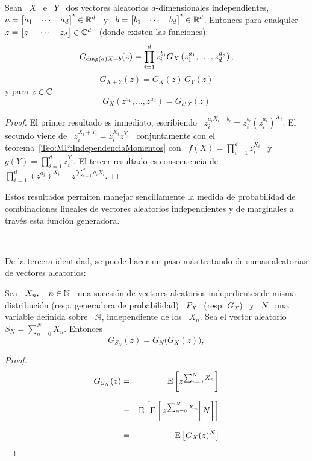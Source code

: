 \begin{teorema}%
\label{Teo:MP:PropiedadesGeneradoraProbabilidad}
%
  Sean  \   $X$  \  e  \   $Y$  \  dos   vectores  aleatorios  $d$-dimensionales
  independientes, $a  = \begin{bmatrix} a_1  & \cdots & a_d  \end{bmatrix}^t \in
  \mathbb{R}^d$ \  y \ $b  = \begin{bmatrix} b_1  & \cdots & b_d  \end{bmatrix}^t \in
  \mathbb{R}^d$.  Entonces  para  cualquier  $z  = \begin{bmatrix}  z_1  &  \cdots  &
    z_d \end{bmatrix}\in \mathbb{C}^d$ \ (donde existen las funciones):
  \[
  G_{\operatorname{diag}(a) X + b}(z) =  \prod_{i=1}^d z_i^{b_i} G_X\left( z_1^{a_1} , \ldots ,
    z_d^{a_d} \right),
  \]
  \[
  G_{X+Y}(z) = G_X(z) \, G_Y(z)
  \]
  y para $z \in \mathbb{C}$
  \[
  G_X\left( z^{a_1} , \ldots , z^{a_d} \right) = G_{a^t X}(z)
  \]
\end{teorema}
%
\begin{proof}
  El  primer  resultado es  inmediato,  escribiendo \  $z_i^{a_i  X_i  + b_i}  =
  z_i^{b_i}   \left(  z_i^{a_i}   \right)^{X_i}$.    El  secundo   viene  de   \
  $z_i^{X_i+Y_i}    =    z_i^{X_i}    z^{Y_i}$    \   conjuntamente    con    el
  teorema~\ref{Teo:MP:IndependenciaMomentos}   con   \   $f(X)  =   \prod_{i=1}^d
  z_i^{X_i}$  \ y \  $g(Y) =  \prod_{i=1}^d z_i^{Y_i}$.  El tercer  resultado es
  consecuencia de $\prod_{i=1}^d  \left( z^{a_i} \right)^{X_i} = z^{\sum_{i=1}^d
    a_i X_i}$.
\end{proof}
%
Estos  resultados permiten manejar  sencillamente la  medida de  probabilidad de
combinaciones lineales  de vectores aleatorios independientes y  de marginales a
trav\'es esta funci\'on generadora.

\

De  la  tercera identidad,  se  puede  hacer un  paso  m\'as  tratando de  sumas
aleatorias de vectores aleatorios:
%
\begin{teorema}
\label{Teo:MP:SumaAleatoriaGeneradoraProbabilidad}
%
  Sea  \ $X_n,  \quad n  \in  \mathbb{N}$ \,  una sucesi\'on  de vectores  aleatorios
  indepedientes de  misma distribuci\'on  (resp.  generadora de  probabilidad) \
  $P_X$ \  (resp. $G_X$)  \ y  \ $N$ \  una variable  definida sobre  \ $\mathbb{N}$,
  independiente de los  \ $X_n$. Sea el vector aleatorio \  $ S_N = \sum_{n=0}^N
  X_n$. Entonces
  \[
  G_{S_N}(z) =  G_N \big( G_X(z) \big),
  \]
\end{teorema}
%
\begin{proof}
  \begin{eqnarray*}
  G_{S_N}(z) & = & \operatorname{E}\left[ z^{\sum_{n=0}^N X_n} \right]\\[2.5mm]
  & = & \operatorname{E}\left[ \operatorname{E}\left[ \left. z^{\sum_{n=0}^N X_n} \right| N  \right] \right]\\[2.5mm]
  & = & \operatorname{E}\left[ G_X(z)^N \right]
  \end{eqnarray*}
\end{proof}


